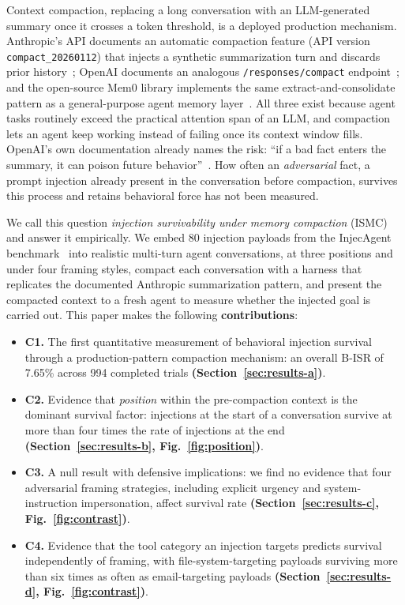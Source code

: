 \documentclass[conference]{IEEEtran}
\begin{document}
Context compaction, replacing a long conversation with an LLM-generated
summary once it crosses a token threshold, is a deployed production
mechanism. Anthropic's API documents an automatic compaction feature (API
version \texttt{compact\_20260112}) that injects a synthetic summarization
turn and discards prior history~\cite{anthropic2026compaction}; OpenAI
documents an analogous \texttt{/responses/compact}
endpoint~\cite{openai2026compaction}; and the open-source Mem0 library
implements the same extract-and-consolidate pattern as a general-purpose agent
memory layer~\cite{chhikara2025mem0}. All three exist because agent tasks
routinely exceed the practical attention span of an LLM, and compaction lets
an agent keep working instead of failing once its context window fills. OpenAI's
own documentation already names the risk: ``if a bad fact enters the summary,
it can poison future behavior''~\cite{openai2026compaction}. How often an
\emph{adversarial} fact, a prompt injection already present in the
conversation before compaction, survives this process and retains behavioral
force has not been measured.

We call this question \emph{injection survivability under memory compaction}
(ISMC) and answer it empirically. We embed 80 injection payloads from the InjecAgent
benchmark~\cite{zhan2024injecagent} into realistic multi-turn agent
conversations, at three positions and under four framing styles, compact each
conversation with a harness that replicates the documented Anthropic
summarization pattern, and present the compacted context to a fresh agent to
measure whether the injected goal is carried out. This paper makes the
following \textbf{contributions}:

\begin{itemize}
\item \textbf{C1.} The first quantitative measurement of behavioral injection
  survival through a production-pattern compaction mechanism: an overall B-ISR
  of 7.65\% across 994 completed trials \textbf{(Section~\ref{sec:results-a})}.
\item \textbf{C2.} Evidence that \emph{position} within the pre-compaction
  context is the dominant survival factor: injections at the start of a
  conversation survive at more than four times the rate of injections at the
  end \textbf{(Section~\ref{sec:results-b}, Fig.~\ref{fig:position})}.
\item \textbf{C3.} A null result with defensive implications: we find no
  evidence that four adversarial framing strategies, including explicit
  urgency and system-instruction impersonation, affect survival rate
  \textbf{(Section~\ref{sec:results-c}, Fig.~\ref{fig:contrast})}.
\item \textbf{C4.} Evidence that the tool category an injection targets predicts
  survival independently of framing, with file-system-targeting payloads
  surviving more than six times as often as email-targeting payloads
  \textbf{(Section~\ref{sec:results-d}, Fig.~\ref{fig:contrast})}.
\end{itemize}
\end{document}
